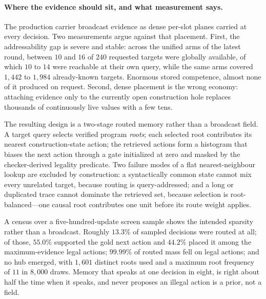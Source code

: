 \documentclass[11pt]{article}
\begin{document}
\paragraph{Where the evidence should sit, and what measurement says.}
The production carrier broadcast evidence as dense per-slot planes carried at every
decision. Two measurements argue against that placement. First, the addressability gap is
severe and stable: across the unified arms of the latest round, between $10$ and $16$ of
$240$ requested targets were globally available, of which $10$ to $14$ were reachable at
their own query, while the same arms covered $1{,}442$ to $1{,}984$ already-known targets.
Enormous stored competence, almost none of it produced on request. Second, dense placement
is the wrong economy: attaching evidence only to the currently open construction hole
replaces thousands of continuously live values with a few tens.

The resulting design is a two-stage routed memory rather than a broadcast field. A target
query selects verified program \emph{roots}; each selected root contributes its nearest
construction-state action; the retrieved actions form a histogram that biases the next
action through a gate initialized at zero and masked by the checker-derived legality
predicate. Two failure modes of a flat nearest-neighbour lookup are excluded by
construction: a syntactically common state cannot mix every unrelated target, because
routing is query-addressed; and a long or duplicated trace cannot dominate the retrieved
set, because selection is root-balanced---one causal root contributes one unit before its
route weight applies.

A census over a five-hundred-update screen sample shows the intended sparsity rather than a
broadcast. Roughly $13.3\%$ of sampled decisions were routed at all; of those, $55.0\%$
supported the gold next action and $44.2\%$ placed it among the maximum-evidence legal
actions; $99.99\%$ of routed mass fell on legal actions; and no hub emerged, with $1{,}601$
distinct roots used and a maximum root frequency of $11$ in $8{,}000$ draws. Memory that
speaks at one decision in eight, is right about half the time when it speaks, and never
proposes an illegal action is a prior, not a field.
\end{document}
